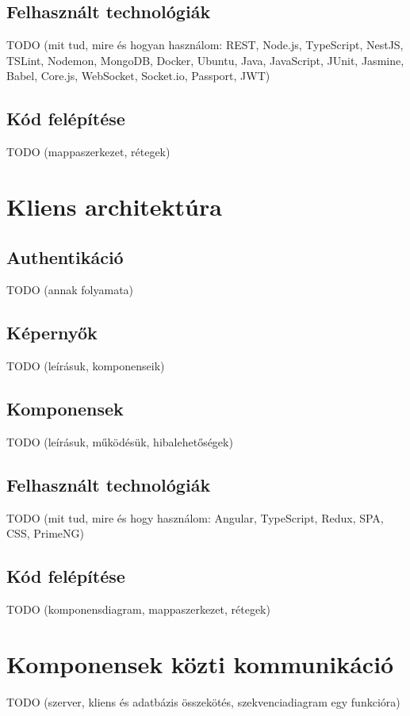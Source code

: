 \documentclass{elteikthesis}
\begin{document}
			\subsection{Felhasznált technológiák}
			TODO (mit tud, mire és hogyan használom: REST, Node.js, TypeScript, NestJS, TSLint, Nodemon, MongoDB, Docker, Ubuntu, Java, JavaScript, JUnit, Jasmine, Babel, Core.js, WebSocket, Socket.io, Passport, JWT)
			
			\subsection{Kód felépítése}
			TODO (mappaszerkezet, rétegek)
		
		\section{Kliens architektúra}

			\subsection{Authentikáció}
			TODO (annak folyamata)
			
			\subsection{Képernyők}
			TODO (leírásuk, komponenseik)
			
			\subsection{Komponensek}
			TODO (leírásuk, működésük, hibalehetőségek)
			
			\subsection{Felhasznált technológiák}
			TODO (mit tud, mire és hogy használom: Angular, TypeScript, Redux, SPA, CSS, PrimeNG)
			
			\subsection{Kód felépítése}
			TODO (komponensdiagram, mappaszerkezet, rétegek)
		
		\section{Komponensek közti kommunikáció}
		TODO (szerver, kliens és adatbázis összekötés, szekvenciadiagram egy funkcióra)
\end{document}
